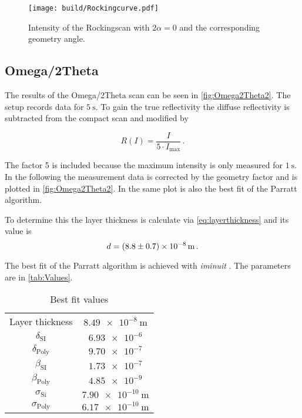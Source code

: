 \begin{figure}[H]
    \centering
    \texttt{[image: build/Rockingcurve.pdf]}
    \caption{Intensity of the Rockingscan with $2\alpha = 0$ and the corresponding geometry angle.} 
    \label{fig:Rockingscan}
\end{figure}

\subsection{Omega/2Theta}

The results of the Omega/2Theta scan can be seen in \autoref{fig:Omega2Theta2}. 
The setup records data for $ \SI{5}{\second}$.
To gain the true reflectivity the diffuse reflectivity is subtracted from the compact scan and modified by

\begin{equation*}
    R(I) =   \frac{I}{5 \cdot I_\text{max}}\,.
\end{equation*}

The factor 5 is included because the maximum intensity is only measured for $\SI{1}{\second}$.
In the following the measurement data is corrected by the geometry factor and is plotted in \autoref{fig:Omega2Theta2}.
In the same plot is also the best fit of the Parratt algorithm.

To determine this the layer thickness is calculate via \autoref{eq:layerthickness} and its value is
\begin{equation*}
    d = \SI{8.8 \pm 0.7e-08}{\meter}\,.
\end{equation*}

The best fit of the Parratt algorithm is achieved with \textit{iminuit} \cite{iminuit}.
The parameters are in \autoref{tab:Values}.


\begin{table}[H]
    \centering
    \caption{Best fit values}
    \label{tab:Values}
    \begin{tabular}{c  c}
    \midrule
          {Layer thickness}         &  $\SI{8.49e-8}{\meter}$  \\    
          {$\delta_{\text{SI}}$}    &  $\num{6.93e-6}$          \\    
          {$\delta_\text{Poly}$}    &  $\num{9.70e-7}$          \\    
          {$\beta_\text{SI}$}        &  $\num{1.73e-7}$          \\    
          {$\beta_\text{Poly}$}     &  $\num{4.85e-9}$          \\    
          {$\sigma_\text{Si}$}      &  $\SI{7.90e-10}{\meter}$  \\    
          {$\sigma_{\text{Poly}}$}   &  $\SI{6.17e-10}{\meter}$  \\    
    \bottomrule
    \end{tabular}
\end{table}


